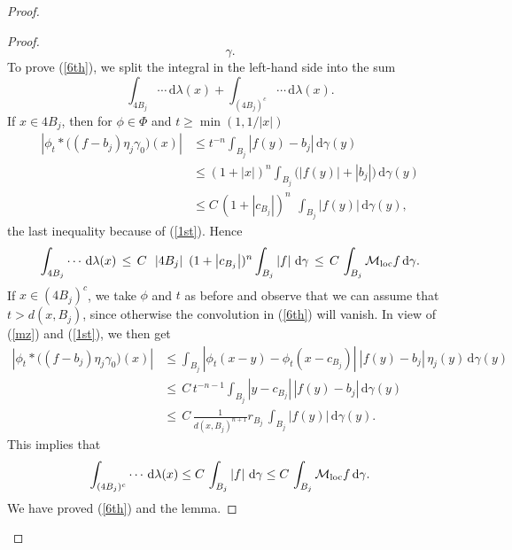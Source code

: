 \documentclass{amsart}                 %
\numberwithin{equation}{section}
\renewcommand\mod[1]{\left\vert{#1}\right\vert}
\newcommand\wrt{\,\mathrm{d}}
\newcommand\1{{\bf 1}}
\newcommand\cM{\mathcal{M}}  \newcommand\fM{\mathfrak{M}}
\newcommand\mlo {\cM_{\textnormal{loc}}}
\begin{document}
\begin{proof}
\begin{proof}
\begin{equation}
\gamma.
\end{equation} 
To prove (\ref{6th}), we split 
the integral in the left-hand side into the sum
$$
\int_{4B_j}\cdots \wrt\lambda(x)+\int_{(4B_j)^c}\cdots \wrt\lambda(x).
$$
If $x\in 4B_j$, then for  $\phi\in\Phi$ and  $t\ge\min(1,1/\mod{x})$
\begin{align*}
\mod{\phi_t*\big((f-b_j)\eta_j\gamma_0\big)(x)}&\le t^{-n} \int_{B_j}
\mod{f(y)-b_j}\wrt \gamma(y)\\ 
&\le (1+\mod{x})^n\int _{B_j}\big(\mod{f(y)}+\mod{b_j}\big)\wrt\gamma
(y) \\ 
\qquad&\le C\,(1+\mod{c_{B_j}})^n\ \,\int_{B_j}
\mod{f(y)}\wrt\gamma(y),
\end{align*} 
 the last inequality because of  (\ref{1st}). Hence
\begin{align*}
\int_{4B_j} \cdots \wrt\lambda(x)\, \le \,C\, \ \mod
{4B_j}\ (1+\mod{c_{B_j}})^n \int_{B_j}\mod{f}\wrt\gamma \,
\le\, C\,\int_{B_j}\mlo f \wrt\gamma .
\end{align*}
If $x\in (4B_j)^c$, we take $\phi$ and $t$ as before and observe that
we can assume that $t> d(x, B_j)$, since otherwise the convolution
in (\ref{6th}) will vanish. In view of (\ref{mz}) and (\ref{1st}),
we then get
\begin{align*}
\mod{\phi_t*\big((f-b_j)\eta_j\gamma_0\big)(x)}&\le\int _{B_j}\mod
{\phi_t(x-y)-\phi_t(x-c_{B_j})}\ \mod{ f(y)-b_j}\,\eta_j(y) \wrt \gamma(y) 
\\ 
&\le\,C\, t^{-n-1} \int_{B_j} \mod{y-c_{B_j}}\,\mod{f(y)-b_j}\wrt \gamma
(y)\\
&\le \,C\,\frac{1}{d(x,B_j)^{n+1}} r_{B_j}\, \int_{B_j}
\mod{f(y)}\wrt\gamma(y).
\end{align*}
This implies that
$$
\int_{(4B_j)^c}\cdots \wrt\lambda(x)\le C\,\int_{B_j}\mod{f}\wrt\gamma\le C\, \int_{B_j} \mlo f \wrt 
\gamma.
$$
We have proved (\ref{6th}) and  the lemma.
\end{proof}


\end{proof}
\end{document}

